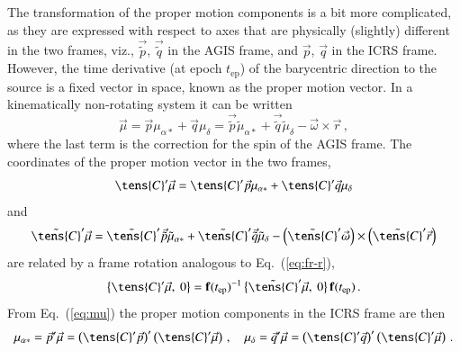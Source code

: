 \documentclass[structabstract]{aa}
\newcommand{\quat}[1]{\mathbf{#1}}
\begin{document}
The transformation of the proper motion components is a bit more
complicated, as they are expressed with respect to axes that are
physically (slightly) different in the two frames, viz., $\vec{\tilde{p}}$, 
$\vec{\tilde{q}}$ in the AGIS frame, and $\vec{p}$, $\vec{q}$ in the 
ICRS frame. However, the time derivative (at epoch $t_\text{ep}$) of 
the barycentric direction to the source is a fixed vector in 
space, known as the proper motion vector. In a kinematically 
non-rotating system it can be written
\begin{equation}\label{eq:mu}
\vec{\mu} = \vec{p}\mu_{\alpha*} + \vec{q}\mu_\delta
= \vec{\tilde{p}}\tilde{\mu}_{\alpha*} +
\vec{\tilde{q}}\tilde{\mu}_\delta - \vec{\omega}\times\vec{r}\, ,
\end{equation}
where the last term is the correction for the spin of the AGIS frame.
The coordinates of the proper motion vector in the two frames,
\begin{equation}\label{eq:mu-icrs}
\tens{C}'\vec{\mu} = \tens{C}'\vec{p}\mu_{\alpha*} + \tens{C}'\vec{q}\mu_\delta
\end{equation}
and
\begin{equation}\label{eq:mu-agis}
\tilde{\tens{C}}'\vec{\mu} = \tilde{\tens{C}}'\vec{\tilde{p}}\tilde{\mu}_{\alpha*} +
\tilde{\tens{C}}'\vec{\tilde{q}}\tilde{\mu}_\delta 
- \left(\tilde{\tens{C}}'\vec{\omega}\right)\times\left(\tilde{\tens{C}}'\vec{r}\right)
\end{equation}
are related by a frame rotation analogous to Eq.~(\ref{eq:fr-r}),
\begin{equation}\label{eq:fr-mu}
\left\{ \tens{C}'\vec{\mu},~0 \right\} = \quat{f}(t_\text{ep})^{-1}
\,\big\{ \tilde{\tens{C}}'\vec{\mu},~0 \big\}\, \quat{f}(t_\text{ep}) \, .
\end{equation} 
From Eq.~(\ref{eq:mu}) the proper motion components in the ICRS 
frame are then
\begin{equation}\label{eq:fr-mu-icrs}
\mu_{\alpha*} = \vec{p}'\vec{\mu} 
= \left(\tens{C}'\vec{p}\right)'\left(\tens{C}'\vec{\mu}\right)\, , \quad 
\mu_\delta = \vec{q}'\vec{\mu}
= \left(\tens{C}'\vec{q}\right)'\left(\tens{C}'\vec{\mu}\right)\, . 
\end{equation} 
\end{document}
